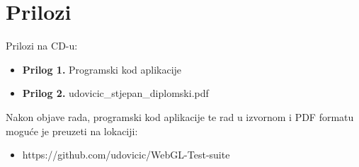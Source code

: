 \documentclass[a4paper,12pt]{extarticle}
\begin{document}



\section*{Prilozi}

Prilozi na CD-u:

\begin{itemize}
\item \textbf{Prilog 1.} Programski kod aplikacije
\item \textbf{Prilog 2.} udovicic\_stjepan\_diplomski.pdf
\end{itemize}

Nakon  objave rada, programski kod aplikacije te rad u izvornom i PDF formatu moguće je preuzeti na lokaciji:

\begin{itemize}
\item https://github.com/udovicic/WebGL-Test-suite
\end{itemize}
\end{document}
